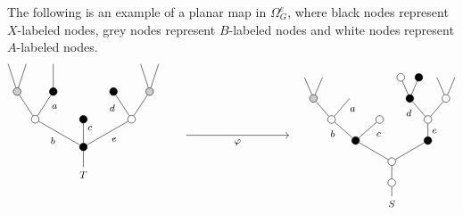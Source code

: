 \documentclass[a4paper,10pt]{article}%
\begin{document}
\begin{example}
The following  is an example of a planar map in $\Omega_G^e$, where black nodes represent $X$-labeled nodes, grey nodes represent $B$-labeled nodes and white nodes represent $A$-labeled nodes.
\begin{equation}\label{REGALTERNMAP EQ}
\begin{tikzpicture}[grow=up,auto,level distance=2.3em,
every node/.style = {font=\footnotesize},
dummy/.style={circle,draw,inner sep=0pt,minimum size=2.25mm}]
	\tikzstyle{level 2}=[sibling distance = 4em]
	\tikzstyle{level 3}=[sibling distance = 3em]
	\tikzstyle{level 4}=[sibling distance = 1.5em]
	\node at (0,0.85) {$T$}
		child{node [dummy,fill = black] {}
			child{node [dummy,fill=white] {}
				child{node [dummy,fill = black!20] {}
					child
					child
				}
				child{node [dummy,fill = black] {}
				edge from parent node [near end] {$d$}}
			edge from parent node [swap] {$e$}}
			child{node [dummy,fill=black] {}
			edge from parent node [swap, near end] {$c$}}
			child{node [dummy,fill=white] {}
				child{node [dummy,fill = black] {}
					child
				edge from parent node [swap, near end] {$a$}}
				child{node [dummy,fill = black!20] {}
					child
					child
				}
			edge from parent node {$b$}}
		};
\begin{scope}[level distance=1.75em]
	\tikzstyle{level 3}=[sibling distance = 6em]
	\tikzstyle{level 4}=[sibling distance = 4em]
	\tikzstyle{level 5}=[sibling distance = 3em]
	\tikzstyle{level 6}=[sibling distance = 1.5em]
	\tikzstyle{level 7}=[sibling distance = 0.75em]
	\node at (9,0) {$S$}
		child{node [dummy,fill = white] {}
			child{node [dummy,fill = white] {}
				child{node [dummy,fill = black] {}
					child{node [dummy,fill=white] {}
						child{node [dummy,fill = white] {}
							child
							child
						}
						child{node [dummy,fill = black] {}
							child{node [dummy,fill=black] {}
						}
							child{node [dummy,fill=white] {}}
						edge from parent node [near end] {$d$}}
					edge from parent node [swap] {$e\phantom{1}$}}
				}
				child{node [dummy,fill = black] {}
					child{node [dummy,fill=white] {}
					edge from parent node [swap, near end] {$c\phantom{1}$}}
					child{node [dummy,fill=white] {}
						child{
						edge from parent node [swap,near end] {$a$}}
						child{node [dummy,fill = black!20] {}
							child
							child
						}
					edge from parent node [near end] {$\phantom{1}b$}}
				}
			}
		};
\end{scope}
	\draw [->] (3,2) -- node [swap] {$\varphi$} (6,2);
\end{tikzpicture}
\end{equation}
\end{example}
\end{document}
